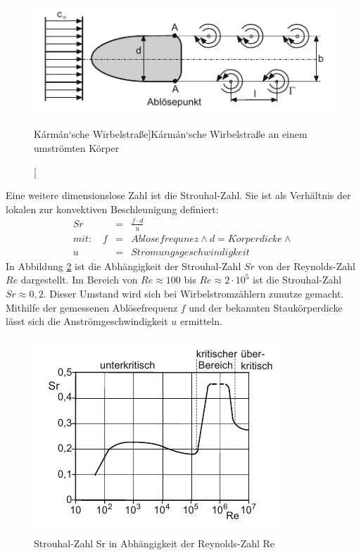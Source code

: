 \begin{figure}[H]
   \centering
    \includegraphics[scale=0.75]{Bilder/Wirbelstrasse.png}
    \caption[K\'{a}rm\'{a}n`sche Wirbelstraße]{K\'{a}rm\'{a}n`sche Wirbelstraße an einem umströmten Körper \footnotemark}
    \label{fig:wirbelstrasse}
\end{figure}
Eine weitere dimensionslose Zahl ist die Strouhal-Zahl. Sie ist als Verhältnis der lokalen zur konvektiven Beschleunigung definiert:\autocite[vgl.][352]{Böge}
\begin{eqnarray}\label{for:Sr}
    Sr&=&\frac{f \cdot d}{u}\\
    mit: \quad f &=& Abl\ddot{o}sefrequnez \land d = K\ddot{o}rperdicke \land \nonumber \\
    u &=& Str\ddot{o}mungsgeschwindigkeit \nonumber
\end{eqnarray}
In Abbildung \ref{fig:re_sr} ist die Abhängigkeit der Strouhal-Zahl $Sr$ von der Reynolds-Zahl $Re$ dargestellt. Im Bereich von $Re \approx 100$ bis $Re \approx 2 \cdot 10^5$ ist die Strouhal-Zahl $Sr \approx 0,2$. Dieser Umstand wird sich bei Wirbelstromzählern zunutze gemacht. Mithilfe der gemessenen Ablösefrequenz $f$ und der bekannten Staukörperdicke lässt sich die Anströmgeschwindigkeit $u$ ermitteln. \autocite[vgl.][442]{Surek}

\begin{figure}[H]
    \centering
    \includegraphics[scale=0.75]{Bilder/Re_Sr.png}
    \caption[Strouhal-Zahl in Abhängigkeit der Reynolds-Zahl]{Strouhal-Zahl Sr in Abhängigkeit der Reynolds-Zahl Re\footnotemark}
    \label{fig:re_sr}
\end{figure}



